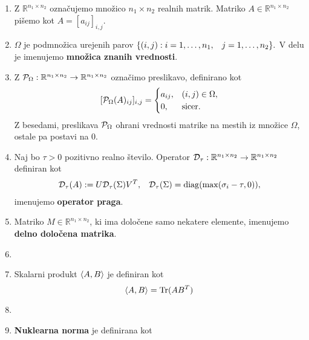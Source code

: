 \begin{enumerate}
  \item Z $\mathbb{R}^{n_1\times n_2}$ označujemo množico $n_1\times n_2$ realnih matrik. Matriko $A\in \mathbb{R}^{n_1\times n_2}$ pišemo kot $A=[a_{ij}]_{i,j}$.
  \item $\Omega$ je podmnožica urejenih parov $\{ (i, j) : i = 1, \hdots , n_1, \hspace{0.3cm} j = 1, \hdots, n_2 \}.$ V delu je imenujemo \textbf{množica znanih vrednosti}.
  \item
        Z $\mathcal{P}_\Omega:\mathbb{R}^{n_1\times n_2}\to \mathbb{R}^{n_1\times n_2}$
        označimo preslikavo, definirano kot
        \[ [\mathcal{P}_\Omega(A)_{ij}]_{i,j} = \begin{cases}
            a_{ij}, & (i, j) \in \Omega, \\
            0,      & \text{sicer}.
          \end{cases}
        \]
        Z besedami, preslikava $\mathcal{P}_\Omega$ ohrani vrednosti matrike na mestih iz množice $\Omega$, ostale pa postavi na 0.
  \item Naj bo $\tau > 0$ pozitivno realno število. Operator $\mathcal{D}_\tau: \mathbb{R}^{n_1 \times n_2} \rightarrow \mathbb{R}^{n_1 \times n_2}$ definiran kot
        \begin{align}
          \label{1007-1959}
          \mathcal{D}_\tau(A) := U \mathcal{D}_\tau(\Sigma) V^T, \hspace{0.3cm} \mathcal{D}_\tau(\Sigma) = \operatorname{diag}(\max(\sigma_i - \tau, 0)),
        \end{align}
        imenujemo \textbf{operator praga}.\cite{CCS}
  \item Matriko $M \in \mathbb{R}^{n_1 \times n_2}$, ki ima določene samo nekatere elemente, imenujemo \textbf{delno določena matrika}.
  \item {}
  \item Skalarni produkt $\langle A, B \rangle$ je definiran kot \[
          \langle A, B \rangle = \operatorname{Tr}(AB^T)
        \]
  \item {}
  \item \textbf{Nuklearna norma} je definirana kot \[
\]
\end{enumerate}

